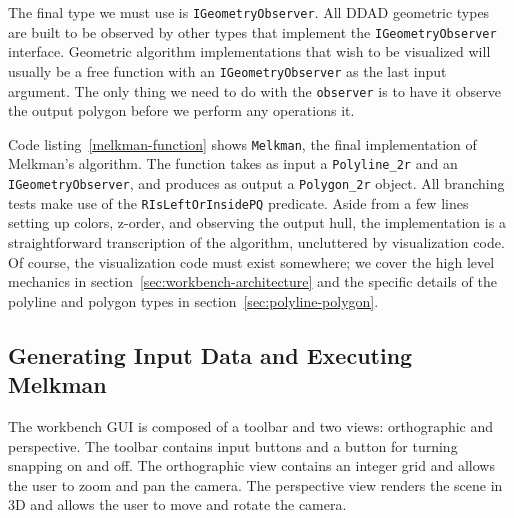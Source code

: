 The final type we must use is \texttt{IGeometryObserver}. All DDAD geometric
types are built to be observed by other types that implement the
\texttt{IGeometryObserver} interface. Geometric algorithm implementations that
wish to be visualized will usually be a free function with an
\texttt{IGeometryObserver} as the last input argument. The only thing we need to
do with the \texttt{observer} is to have it observe the output polygon before we
perform any operations it.

Code listing~\ref{melkman-function} shows \texttt{Melkman}, the final 
implementation of Melkman's algorithm. The function takes as input a 
\texttt{Polyline\_2r} and an \texttt{IGeometryObserver}, and produces as output
a \texttt{Polygon\_2r} object. All branching tests make use of the
\texttt{RIsLeftOrInsidePQ} predicate. Aside from a few lines setting up colors,
z-order, and observing the output hull, the implementation is a straightforward
transcription of the algorithm, uncluttered by visualization code. Of course,
the visualization code must exist somewhere; we cover the high level mechanics
in section~\ref{sec:workbench-architecture} and the specific details of the
polyline and polygon types in section~\ref{sec:polyline-polygon}.
 


% 





% 

% 
  


\subsection{Generating Input Data and Executing Melkman} 

The workbench GUI is composed of a toolbar and two views: orthographic and
perspective. The toolbar contains input buttons and a button for turning
snapping on and off. The orthographic view contains an integer grid and allows
the user to zoom and pan the camera. The perspective view renders the scene in
3D and allows the user to move and rotate the camera.  

